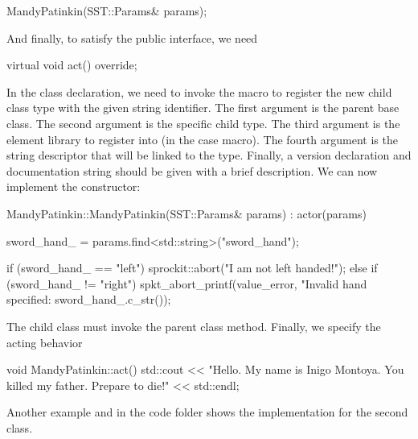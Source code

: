 \begin{CppCode}
MandyPatinkin(SST::Params& params);
\end{CppCode}

And finally, to satisfy the  public interface, we need

\begin{CppCode}
virtual void act() override;
\end{CppCode}

In the class declaration, we need to invoke the macro  to register
the new child class type with the given string identifier.
The first argument is the parent base class. 
The second argument is the specific child type.
The third argument is the element library to register into  (in the case macro).
The fourth argument is the string descriptor that will be linked to the type.
Finally, a version declaration and documentation string should be given with a brief description.
We can now implement the constructor:

\begin{CppCode}
MandyPatinkin::MandyPatinkin(SST::Params& params) :
  actor(params)
{
  sword_hand_ = params.find<std::string>("sword_hand");

  if (sword_hand_ == "left"){
    sprockit::abort("I am not left handed!");
  }
  else if (sword_hand_ != "right"){
      spkt_abort_printf(value_error,
          "Invalid hand specified: %
          sword_hand_.c_str());
  }
}
\end{CppCode}
The child class must invoke the parent class method. 
Finally, we specify the acting behavior

\begin{CppCode}
void MandyPatinkin::act()
{
    std::cout << "Hello. My name is Inigo Montoya. You killed my father. Prepare to die!"
              << std::endl;
}
\end{CppCode}

Another example  and  in the code folder shows the implementation for the second class.

